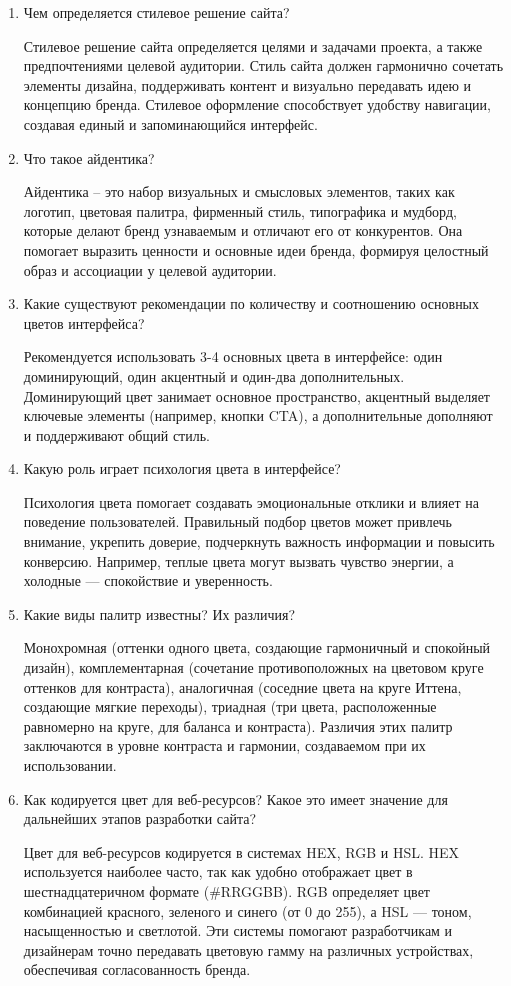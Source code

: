 \begin{enumerate}
    \item Чем определяется стилевое решение сайта?

    Стилевое решение сайта определяется целями и задачами проекта, а также предпочтениями целевой аудитории. Стиль сайта должен гармонично сочетать элементы дизайна, поддерживать контент и визуально передавать идею и концепцию бренда. Стилевое оформление способствует удобству навигации, создавая единый и запоминающийся интерфейс.
    \item Что такое айдентика?

    Айдентика – это набор визуальных и смысловых элементов, таких как логотип, цветовая палитра, фирменный стиль, типографика и мудборд, которые делают бренд узнаваемым и отличают его от конкурентов. Она помогает выразить ценности и основные идеи бренда, формируя целостный образ и ассоциации у целевой аудитории.
    \item Какие существуют рекомендации по количеству и соотношению основных цветов интерфейса?

    Рекомендуется использовать 3-4 основных цвета в интерфейсе: один доминирующий, один акцентный и один-два дополнительных. Доминирующий цвет занимает основное пространство, акцентный выделяет ключевые элементы (например, кнопки CTA), а дополнительные дополняют и поддерживают общий стиль.
    \item Какую роль играет психология цвета в интерфейсе?

    Психология цвета помогает создавать эмоциональные отклики и влияет на поведение пользователей. Правильный подбор цветов может привлечь внимание, укрепить доверие, подчеркнуть важность информации и повысить конверсию. Например, теплые цвета могут вызвать чувство энергии, а холодные — спокойствие и уверенность.
    \item Какие виды палитр известны? Их различия?

        Монохромная (оттенки одного цвета, создающие гармоничный и спокойный дизайн), комплементарная (сочетание противоположных на цветовом круге оттенков для контраста), аналогичная (соседние цвета на круге Иттена, создающие мягкие переходы), триадная (три цвета, расположенные равномерно на круге, для баланса и контраста).
    Различия этих палитр заключаются в уровне контраста и гармонии, создаваемом при их использовании.
    \item Как кодируется цвет для веб-ресурсов? Какое это имеет значение для дальнейших этапов разработки сайта?

    Цвет для веб-ресурсов кодируется в системах HEX, RGB и HSL. HEX используется наиболее часто, так как удобно отображает цвет в шестнадцатеричном формате (\#RRGGBB). RGB определяет цвет комбинацией красного, зеленого и синего (от 0 до 255), а HSL — тоном, насыщенностью и светлотой. Эти системы помогают разработчикам и дизайнерам точно передавать цветовую гамму на различных устройствах, обеспечивая согласованность бренда.
\end{enumerate}


